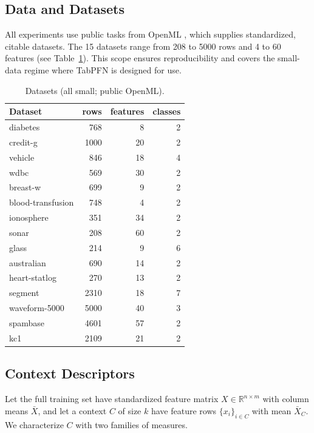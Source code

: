 \documentclass{article}
\begin{document}
\subsection{Data and Datasets}

All experiments use public tasks from OpenML \cite{vanschoren2014openml}, which supplies standardized, citable datasets. The 15 datasets range from 208 to 5000 rows and 4 to 60 features (see Table~\ref{tab:datasets}). This scope ensures reproducibility and covers the small-data regime where TabPFN is designed for use.

\begin{table}[h]
\centering
\caption{Datasets (all small; public OpenML).}
\label{tab:datasets}
\begin{tabular}{lrrr}
\toprule
Dataset & rows & features & classes \\
\midrule
diabetes           & 768  & 8  & 2 \\
credit-g           & 1000 & 20 & 2 \\
vehicle            & 846  & 18 & 4 \\
wdbc               & 569  & 30 & 2 \\
breast-w           & 699  & 9  & 2 \\
blood-transfusion  & 748  & 4  & 2 \\
ionosphere         & 351  & 34 & 2 \\
sonar              & 208  & 60 & 2 \\
glass              & 214  & 9  & 6 \\
australian         & 690  & 14 & 2 \\
heart-statlog      & 270  & 13 & 2 \\
segment            & 2310 & 18 & 7 \\
waveform-5000      & 5000 & 40 & 3 \\
spambase           & 4601 & 57 & 2 \\
kc1                & 2109 & 21 & 2 \\
\bottomrule
\end{tabular}
\end{table}

\subsection{Context Descriptors}

Let the full training set have standardized feature matrix $X\in\mathbb{R}^{n\times m}$ with column means $\bar{X}$, and let a context $C$ of size $k$ have feature rows $\{x_i\}_{i\in C}$ with mean $\bar{X}_C$. We characterize $C$ with two families of measures.
\end{document}
